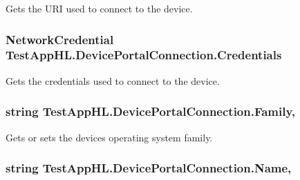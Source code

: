 Gets the U\+RI used to connect to the device. 

\subsubsection[{\texorpdfstring{Credentials}{Credentials}}]{\setlength{\rightskip}{0pt plus 5cm}Network\+Credential Test\+App\+H\+L.\+Device\+Portal\+Connection.\+Credentials\hspace{0.3cm}{\ttfamily [get]}}\hypertarget{class_test_app_h_l_1_1_device_portal_connection_ae1da92e680a10b77ecb2e301c1061c5c}{}\label{class_test_app_h_l_1_1_device_portal_connection_ae1da92e680a10b77ecb2e301c1061c5c}


Gets the credentials used to connect to the device. 

\subsubsection[{\texorpdfstring{Family}{Family}}]{\setlength{\rightskip}{0pt plus 5cm}string Test\+App\+H\+L.\+Device\+Portal\+Connection.\+Family\hspace{0.3cm}{\ttfamily [get]}, {\ttfamily [set]}}\hypertarget{class_test_app_h_l_1_1_device_portal_connection_ad730d52aa9b03cf73fc48dd94239a34b}{}\label{class_test_app_h_l_1_1_device_portal_connection_ad730d52aa9b03cf73fc48dd94239a34b}


Gets or sets the device\textquotesingle{}s operating system family. 

\subsubsection[{\texorpdfstring{Name}{Name}}]{\setlength{\rightskip}{0pt plus 5cm}string Test\+App\+H\+L.\+Device\+Portal\+Connection.\+Name\hspace{0.3cm}{\ttfamily [get]}, {\ttfamily [set]}}\hypertarget{class_test_app_h_l_1_1_device_portal_connection_a5c7a636dd0230c26c19e656189320f74}{}\label{class_test_app_h_l_1_1_device_portal_connection_a5c7a636dd0230c26c19e656189320f74}


